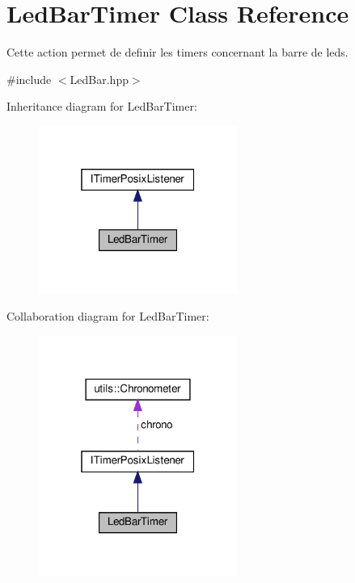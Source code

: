 \hypertarget{classLedBarTimer}{}\section{Led\+Bar\+Timer Class Reference}
\label{classLedBarTimer}


Cette action permet de definir les timers concernant la barre de leds.  




{\ttfamily \#include $<$Led\+Bar.\+hpp$>$}



Inheritance diagram for Led\+Bar\+Timer\+:
\nopagebreak
\begin{figure}[H]
\begin{center}
\leavevmode
\includegraphics[width=184pt]{classLedBarTimer__inherit__graph}
\end{center}
\end{figure}


Collaboration diagram for Led\+Bar\+Timer\+:
\nopagebreak
\begin{figure}[H]
\begin{center}
\leavevmode
\includegraphics[width=184pt]{classLedBarTimer__coll__graph}
\end{center}
\end{figure}
